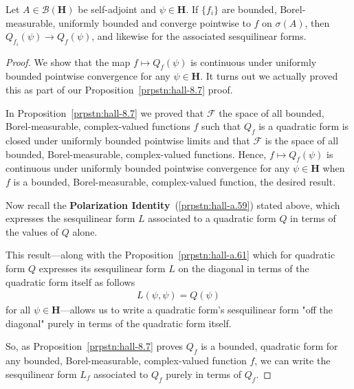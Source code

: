 \begin{proposition}
    \label{prpstn:Q-continuous-under-limits}
    \leanok
    Let $A \in \mathcal{B}(\mathbf{H})$ be self-adjoint and $\psi \in \mathbf{H}$. If $\{f_i\}$ are bounded, Borel-measurable, uniformly bounded and converge pointwise to $f$ on $\sigma(A)$, then $Q_{f_i}(\psi) \rightarrow Q_f(\psi)$, and likewise for the associated sesquilinear forms.
\end{proposition}
\begin{proof}
    \leanok
We show that the map $f \mapsto Q_f(\psi)$ is continuous under uniformly bounded pointwise convergence for any $\psi \in \mathbf{H}$. It turns out we actually proved this as part of our Proposition~\ref{prpstn:hall-8.7} proof.

In Proposition~\ref{prpstn:hall-8.7} we proved that $\mathcal{F}$ the space of all bounded, Borel-measurable, complex-valued functions $f$ such that $Q_f$ is a quadratic form is closed under uniformly bounded pointwise limits and that $\mathcal{F}$ is the space of all bounded, Borel-measurable, complex-valued functions. Hence, $f \mapsto Q_f(\psi)$ is continuous under uniformly bounded pointwise convergence for any $\psi \in \mathbf{H}$ when $f$ is a bounded, Borel-measurable, complex-valued function, the desired result.

Now recall the \textbf{Polarization Identity}~(\ref{prpstn:hall-a.59}) stated above, which expresses the sesquilinear form $L$ associated to a quadratic form $Q$ in terms of the values of $Q$ alone.

This result---along with the Proposition~\ref{prpstn:hall-a.61} which for quadratic form $Q$ expresses its sesquilinear form $L$ on the diagonal in terms of the quadratic form itself as follows
\begin{align}
    L(\psi, \psi) = Q(\psi)
\end{align}
for all $\psi \in \mathbf{H}$---allows us to write a quadratic form's sesquilinear form "off the diagonal" purely in terms of the quadratic form itself.

So, as Proposition~\ref{prpstn:hall-8.7} proves $Q_f$ is a bounded, quadratic form for any bounded, Borel-measurable, complex-valued function $f$, we can write the sesquilinear form $L_f$ associated to $Q_f$ purely in terms of $Q_f$.


\end{proof}
